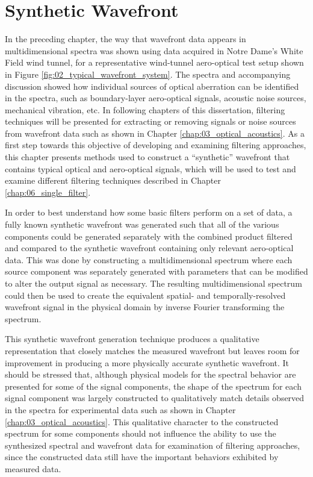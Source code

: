 
\chapter{Synthetic Wavefront}
\label{chap:05_synthetic}

In the preceding chapter, the way that wavefront data appears in multidimensional spectra was shown using data acquired in Notre Dame’s White Field wind tunnel, for a representative wind-tunnel aero-optical test setup shown in Figure \ref{fig:02_typical_wavefront_system}.
The spectra and accompanying discussion showed how individual sources of optical aberration can be identified in the spectra, such as boundary-layer aero-optical signals, acoustic noise sources, mechanical vibration, etc.
In following chapters of this dissertation, filtering techniques will be presented for extracting or removing signals or noise sources from wavefront data such as shown in Chapter \ref{chap:03_optical_acoustics}.
As a first step towards this objective of developing and examining filtering approaches, this chapter presents methods used to construct a ``synthetic'' wavefront that contains typical optical and aero-optical signals, which will be used to test and examine different filtering techniques described in Chapter \ref{chap:06_single_filter}.

In order to best understand how some basic filters perform on a set of data, a fully known synthetic wavefront was generated such that all of the various components could be generated separately with the combined product filtered and compared to the synthetic wavefront containing only relevant aero-optical data.
This was done by constructing a multidimensional spectrum where each source component was separately generated with parameters that can be modified to alter the output signal as necessary.
The resulting multidimensional spectrum could then be used to create the equivalent spatial- and temporally-resolved wavefront signal in the physical domain by inverse Fourier transforming the spectrum.

This synthetic wavefront generation technique produces a qualitative representation that closely matches the measured wavefront but leaves room for improvement in producing a more physically accurate synthetic wavefront.
It should be stressed that, although physical models for the spectral behavior are presented for some of the signal components, the shape of the spectrum for each signal component was largely constructed to qualitatively match details observed in the spectra for experimental data such as shown in Chapter \ref{chap:03_optical_acoustics}.
This qualitative character to the constructed spectrum for some components should not influence the ability to use the synthesized spectral and wavefront data for examination of filtering approaches, since the constructed data still have the important behaviors exhibited by measured data.

